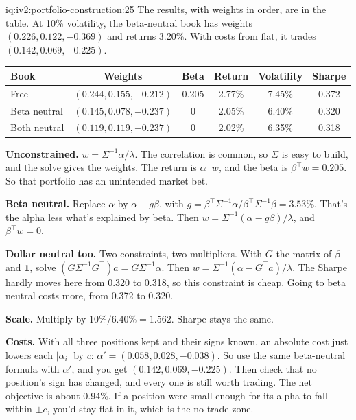 \begin{solution}{iq:iv2:portfolio-construction:25}
The results, with weights in order, are in the table. At 10\% volatility, the beta-neutral book has weights $(0.226, 0.122, -0.369)$ and returns 3.20\%. With costs from flat, it trades $(0.142, 0.069, -0.225)$.

\begin{center}
\begin{tabular}{lccccc}
\toprule
Book & Weights & Beta & Return & Volatility & Sharpe \\
\midrule
Free & $(0.244, 0.155, -0.212)$ & 0.205 & 2.77\% & 7.45\% & 0.372 \\
Beta neutral & $(0.145, 0.078, -0.237)$ & 0 & 2.05\% & 6.40\% & 0.320 \\
Both neutral & $(0.119, 0.119, -0.237)$ & 0 & 2.02\% & 6.35\% & 0.318 \\
\bottomrule
\end{tabular}
\end{center}

\textbf{Unconstrained.} $w = \Sigma^{-1}\alpha/\lambda$. The correlation is common, so $\Sigma$ is easy to build, and the solve gives the weights. The return is $\alpha^\top w$, and the beta is $\beta^\top w = 0.205$. So that portfolio has an unintended market bet.

\textbf{Beta neutral.} Replace $\alpha$ by $\alpha - g\beta$, with $g = \beta^\top\Sigma^{-1}\alpha/\beta^\top\Sigma^{-1}\beta = 3.53\%$. That's the alpha less what's explained by beta. Then $w = \Sigma^{-1}(\alpha - g\beta)/\lambda$, and $\beta^\top w = 0$.

\textbf{Dollar neutral too.} Two constraints, two multipliers. With $G$ the matrix of $\beta$ and $\mathbf{1}$, solve $(G\Sigma^{-1}G^\top)a = G\Sigma^{-1}\alpha$. Then $w = \Sigma^{-1}(\alpha - G^\top a)/\lambda$. The Sharpe hardly moves here from 0.320 to 0.318, so this constraint is cheap. Going to beta neutral costs more, from 0.372 to 0.320.

\textbf{Scale.} Multiply by $10\%/6.40\% = 1.562$. Sharpe stays the same.

\textbf{Costs.} With all three positions kept and their signs known, an absolute cost just lowers each $|\alpha_i|$ by $c$: $\alpha' = (0.058, 0.028, -0.038)$. So use the same beta-neutral formula with $\alpha'$, and you get $(0.142, 0.069, -0.225)$. Then check that no position's sign has changed, and every one is still worth trading. The net objective is about 0.94\%. If a position were small enough for its alpha to fall within $\pm c$, you'd stay flat in it, which is the no-trade zone.


\end{solution}

